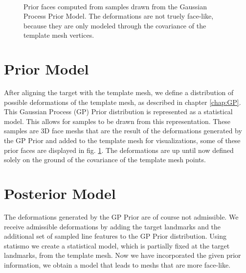 \begin{figure}[h]
\centering
{}\\
\caption{Prior faces computed from samples drawn from the Gaussian Process Prior Model. The deformations are not truely face-like, because they are only modeled through the covariance of the template mesh vertices.}
\label{fig:priorprofile}
\end{figure}

\section{Prior Model}
After aligning the target with the template mesh, we define a distribution of possible deformations of the template mesh, as described in chapter \ref{chap:GP}. This Gaussian Process (GP) Prior distribution is represented as a statistical model. This allows for samples to be drawn from this representation. These samples are 3D face meshs that are the result of the deformations generated by the GP Prior and added to the template mesh for visualizations, some of these prior faces are displayed in fig. \ref{fig:priorprofile}. The deformations are up until now defined solely on the ground of the covariance of the template mesh points.

\section{Posterior Model}
The deformations generated by the GP Prior are of course not admissible. We receive admissible deformations by adding the target landmarks and the additional set of sampled line features to the GP Prior distribution. Using statismo we create a statistical model, which is partially fixed at the target landmarks, from the template mesh. Now we have incorporated the given prior information, we obtain a model that leads to meshs that are more face-like.

